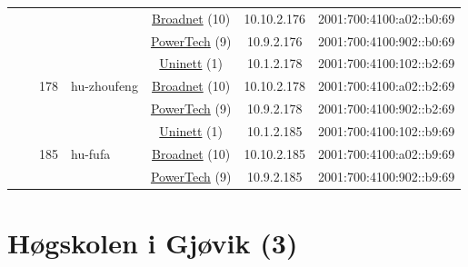 \begin{small}
\begin{center}
\begin{longtable}{|c|c|c|c|c|c|c|c|}
  &  &  &  & \multicolumn{2}{|c|}{\tiny{\href{https://www.broadnet.no}{Broadnet} (10)}} & \tiny{10.10.2.176} & \tiny{2001:700:4100:a02::b0:69} \\* \cline{5-5}\cline{6-6}\cline{7-7}\cline{8-8}
  &  &  &  & \multicolumn{2}{|c|}{\tiny{\href{http://www.powertech.no}{PowerTech} (9)}} & \tiny{10.9.2.176} & \tiny{2001:700:4100:902::b0:69} \\* \cline{3-3}\cline{4-4}\cline{5-5}\cline{6-6}\cline{7-7}\cline{8-8}
  &  & \multirow{3}{*}{\tiny{178}} & \multicolumn{1}{|l|}{\multirow{3}{*}{\tiny{hu-zhoufeng}}} & \multicolumn{2}{|c|}{\tiny{\href{https://www.uninett.no}{Uninett} (1)}} & \tiny{10.1.2.178} & \tiny{2001:700:4100:102::b2:69} \\* \cline{5-5}\cline{6-6}\cline{7-7}\cline{8-8}
  &  &  &  & \multicolumn{2}{|c|}{\tiny{\href{https://www.broadnet.no}{Broadnet} (10)}} & \tiny{10.10.2.178} & \tiny{2001:700:4100:a02::b2:69} \\* \cline{5-5}\cline{6-6}\cline{7-7}\cline{8-8}
  &  &  &  & \multicolumn{2}{|c|}{\tiny{\href{http://www.powertech.no}{PowerTech} (9)}} & \tiny{10.9.2.178} & \tiny{2001:700:4100:902::b2:69} \\* \cline{3-3}\cline{4-4}\cline{5-5}\cline{6-6}\cline{7-7}\cline{8-8}
  &  & \multirow{3}{*}{\tiny{185}} & \multicolumn{1}{|l|}{\multirow{3}{*}{\tiny{hu-fufa}}} & \multicolumn{2}{|c|}{\tiny{\href{https://www.uninett.no}{Uninett} (1)}} & \tiny{10.1.2.185} & \tiny{2001:700:4100:102::b9:69} \\* \cline{5-5}\cline{6-6}\cline{7-7}\cline{8-8}
  &  &  &  & \multicolumn{2}{|c|}{\tiny{\href{https://www.broadnet.no}{Broadnet} (10)}} & \tiny{10.10.2.185} & \tiny{2001:700:4100:a02::b9:69} \\* \cline{5-5}\cline{6-6}\cline{7-7}\cline{8-8}
  &  &  &  & \multicolumn{2}{|c|}{\tiny{\href{http://www.powertech.no}{PowerTech} (9)}} & \tiny{10.9.2.185} & \tiny{2001:700:4100:902::b9:69} \\ \hline
\end{longtable}
\end{center}
\end{small}



\section{Høgskolen i Gjøvik (3)}
\label{sec:HiG}

